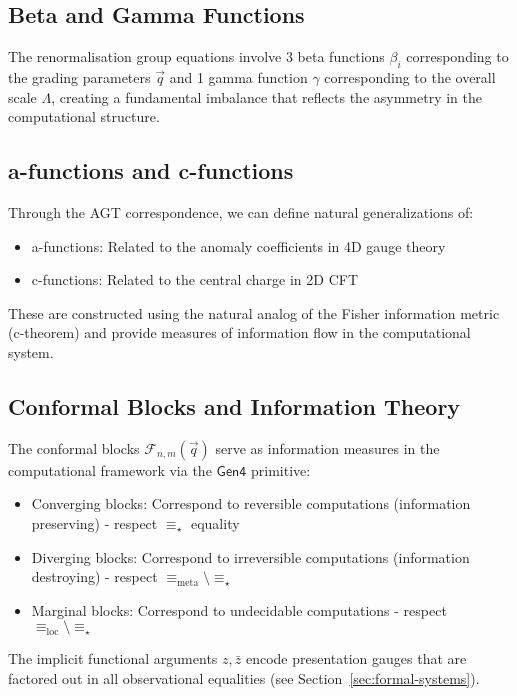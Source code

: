 \subsection{Beta and Gamma Functions}

\begin{definition}
\label{def:beta-gamma}
The renormalisation group equations involve 3 beta functions $\beta_i$ corresponding to the grading parameters $\vec{q}$ and 1 gamma function $\gamma$ corresponding to the overall scale $\Lambda$, creating a fundamental imbalance that reflects the asymmetry in the computational structure.
\end{definition}

\subsection{a-functions and c-functions}

\begin{conjecture}
\label{conj:a-c-functions}
Through the AGT correspondence, we can define natural generalizations of:
\begin{itemize}
\item a-functions: Related to the anomaly coefficients in 4D gauge theory
\item c-functions: Related to the central charge in 2D CFT
\end{itemize}
These are constructed using the natural analog of the Fisher information metric (c-theorem) and provide measures of information flow in the computational system.
\end{conjecture}

\subsection{Conformal Blocks and Information Theory}

\begin{theorem}
\label{thm:blocks-information-gen4}
The conformal blocks $\mathcal{F}_{n,m}(\vec{q})$ serve as information measures in the computational framework via the $\mathsf{Gen4}$ primitive:
\begin{itemize}
\item Converging blocks: Correspond to reversible computations (information preserving) - respect $\equiv_\star$ equality
\item Diverging blocks: Correspond to irreversible computations (information destroying) - respect $\equiv_{\text{meta}} \setminus \equiv_\star$
\item Marginal blocks: Correspond to undecidable computations - respect $\equiv_{\text{loc}} \setminus \equiv_\star$
\end{itemize}
The implicit functional arguments $z, \bar{z}$ encode presentation gauges that are factored out in all observational equalities (see Section~\ref{sec:formal-systems}).
\end{theorem}


